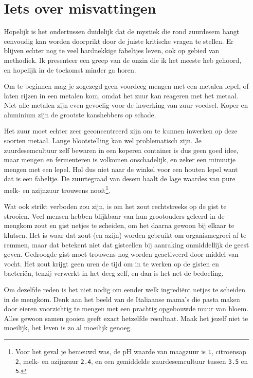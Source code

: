 \documentclass[
  11pt,
  dutch,
]{memoir}
\begin{document}
\hypertarget{iets-over-misvattingen}{%
\section{Iets over misvattingen}\label{iets-over-misvattingen}}

Hopelijk is het ondertussen duidelijk dat de mystiek die rond zuurdesem
hangt eenvoudig kan worden doorprikt door de juiste kritische vragen te
stellen. Er blijven echter nog te veel hardnekkige fabeltjes leven, ook
op gebied van methodiek. Ik presenteer een greep van de onzin die ik het
meeste heb gehoord, en hopelijk in de toekomst minder ga horen.

Om te beginnen mag je zogezegd geen voordeeg mengen met een metalen
lepel, of laten rijzen in een metalen kom, omdat het zuur kan reageren
met het metaal. Niet alle metalen zijn even gevoelig voor de inwerking
van zuur voedsel. Koper en aluminium zijn de grootste kanshebbers op
schade.

Het zuur moet echter zeer geconcentreerd zijn om te kunnen inwerken op
deze soorten metaal. Lange blootstelling kan wel problematisch zijn. Je
zuurdesemcultuur zelf bewaren in een koperen container is dus geen goed
idee, maar mengen en fermenteren is volkomen onschadelijk, en zeker een
minuutje mengen met een lepel. Hol dus niet naar de winkel voor een
houten lepel want dat is een fabeltje. De zuurtegraad van desem haalt de
lage waardes van pure melk- en azijnzuur trouwens nooit\footnote{Voor
  het geval je benieuwd was, de pH waarde van maagzuur is \texttt{1},
  citroensap \texttt{2}, melk- en azijnzuur \texttt{2.4}, en een
  gemiddelde zuurdesemcultuur tussen \texttt{3.5} en \texttt{5}.}.

Wat ook strikt verboden zou zijn, is om het zout rechtstreeks op de gist
te strooien. Veel mensen hebben blijkbaar van hun grootouders geleerd in
de mengkom zout en gist netjes te scheiden, om het daarna gewoon bij
elkaar te klutsen. Het is waar dat zout (en azijn) worden gebruikt om
organismegroei af te remmen, maar dat betekent niet dat gistcellen bij
aanraking onmiddellijk de geest geven. Gedroogde gist moet trouwens nog
worden geactiveerd door middel van vocht. Het zout krijgt geen uren de
tijd om in te werken op de gisten en bacteriën, tenzij verwerkt in het
deeg zelf, en dan is het net de bedoeling.

Om dezelfde reden is het niet nodig om eender welk ingrediënt netjes te
scheiden in de mengkom. Denk aan het beeld van de Italiaanse mama's die
pasta maken door eieren voorzichtig te mengen met een prachtig
opgebouwde muur van bloem. Alles gewoon samen gooien geeft exact
hetzelfde resultaat. Maak het jezelf niet te moeilijk, het leven is zo
al moeilijk genoeg.
\end{document}
